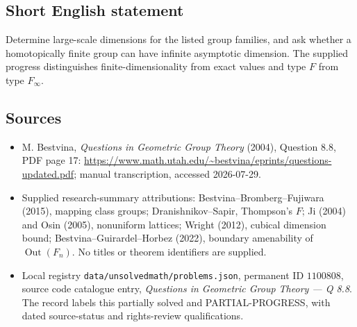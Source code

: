 \documentclass[11pt]{article}
\begin{document}
\subsection{Short English statement}
Determine large-scale dimensions for the listed group families, and ask whether a homotopically finite group can have infinite asymptotic dimension. The supplied progress distinguishes finite-dimensionality from exact values and type $F$ from type $F_{\infty}$.
\subsection{Sources}
\begin{itemize}
\item M. Bestvina, \emph{Questions in Geometric Group Theory} (2004), Question 8.8, PDF page 17: \url{https://www.math.utah.edu/~bestvina/eprints/questions-updated.pdf}; manual transcription, accessed 2026-07-29.
\item Supplied research-summary attributions: Bestvina--Bromberg--Fujiwara (2015), mapping class groups; Dranishnikov--Sapir, Thompson's $F$; Ji (2004) and Osin (2005), nonuniform lattices; Wright (2012), cubical dimension bound; Bestvina--Guirardel--Horbez (2022), boundary amenability of $\operatorname{Out}(F_n)$. No titles or theorem identifiers are supplied.
\item Local registry \texttt{data/unsolvedmath/problems.json}, permanent ID $1100808$, source code catalogue entry, \emph{Questions in Geometric Group Theory --- Q 8.8}. The record labels this partially solved and PARTIAL-PROGRESS, with dated source-status and rights-review qualifications.
\end{itemize}
\end{document}
